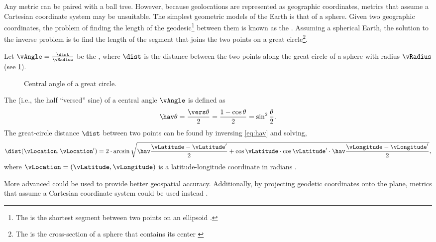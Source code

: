 Any metric can be paired with a ball tree. However, because geolocations are represented as geographic coordinates, metrics that assume a Cartesian coordinate system may be unsuitable. The simplest geometric models of the Earth is that of a sphere. Given two geographic coordinates, the problem of finding the length of the geodesic\footnote{The  is the shortest segment between two points on an ellipsoid \citep{Lu2014}.} between them is known as the  \citep{Sjoberg2012}. Assuming a spherical Earth, the solution to the inverse problem is to find the length of the segment that joins the two points on a great circle\footnote{The  is the cross-section of a sphere that contains its center \citep{Lu2014}}.

Let $\vAngle = \frac{\dist}{\vRadius}$ be the , where $\dist$ is the distance between the two points along the great circle of a sphere with radius $\vRadius$ (see \cref{fig:central-angle}).

\begin{figure}[htbp]
\centering
{}
\caption[Central angle of a great circle]{Central angle of a great circle.}
\label{fig:central-angle}
\end{figure}

The  (i.e., the half ``versed'' sine) of a central angle $\vAngle$ is defined as
\begin{equation}
  \hav \theta = \frac{\vers \theta}{2}  = \frac{1 - \cos \theta}{2}= \sin^2 \frac{\theta}{2}. \label{eq:hav}
\end{equation}
The great-circle distance $\dist$ between two points can be found by inversing \cref{eq:hav} and solving,
\begin{equation*}
  \dist(\vLocation, \vLocation') = 2 \cdot \arcsin \sqrt{\hav \frac{\vLatitude - \vLatitude'}{2} + \cos \vLatitude \cdot \cos \vLatitude' \cdot \hav \frac{\vLongitude - \vLongitude'}{2}},
\end{equation*}
where $\vLocation = (\vLatitude, \vLongitude)$ is a latitude-longitude coordinate in radians \citep[pp. 157--162]{Brummelen2013}.

More advanced  \citep[pp. 71--130]{Lu2014} could be used to provide better geospatial accuracy. Additionally, by projecting geodetic coordinates onto the plane, metrics that assume a Cartesian coordinate system could be used instead \citep[pp. 265--326]{Lu2014}.